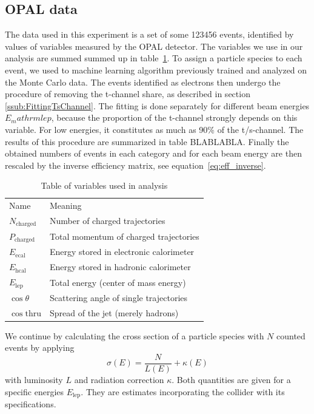\subsection{OPAL data}
\label{sub:opal_data}
The data used in this experiment is a set of some 123456 events, identified by 
values of variables measured by the OPAL detector. The variables we use in our 
analysis are summed summed up in table~\ref{tab:vars}. To assign a particle species 
to each event, we used to machine learning algorithm previously trained and analyzed 
on the Monte Carlo data. The events identified as electrons then undergo the procedure 
of removing the t-channel share, as described in section \ref{ssub:FittingTsChannel}.
The fitting is done separately for different beam energies $E_mathrm{lep}$, because 
the proportion of the t-channel strongly depends on this variable. 
For low energies, it constitutes as much as 90\% of the t/s-channel.
The results of this procedure are summarized in table BLABLABLA. 
Finally the obtained numbers of events in each category and for each beam energy 
are then rescaled by the inverse efficiency matrix, see equation~\eqref{eq:eff_inverse}.
\begin{table}[htpb]
    \centering
    \caption{Table of variables used in analysis}
    \label{tab:vars}
    \begin{tabular}{l|l}
  \rowcolor{LightCyan} Name & Meaning \\ 
    $N_{\mathrm{charged} }$ & Number of charged trajectories \\
    $P_{\mathrm{charged} }$ & Total momentum of charged trajectories \\
    $E_{\mathrm{ecal}}$ & Energy stored in electronic calorimeter \\
    $E_{\mathrm{hcal}}$ & Energy stored in hadronic calorimeter \\
    $E_{\mathrm{lep}}$ & Total energy (center of mass energy) \\
    $\cos\theta$ & Scattering angle of single trajectories \\
    $\cos\mathrm{thru} $ & Spread of the jet (merely hadrons)\\
    \end{tabular}
\end{table}

We continue by calculating the cross section of a particle species with $N$ counted events by applying  
\begin{equation}
    \sigma(E) = \frac{N}{L(E)} + \kappa(E)
\end{equation}
with luminosity $L$ and radiation correction $\kappa$. Both quantities are given for a specific energies $E_\mathrm{lep}$. 
They are estimates incorporating the collider with its specifications.
